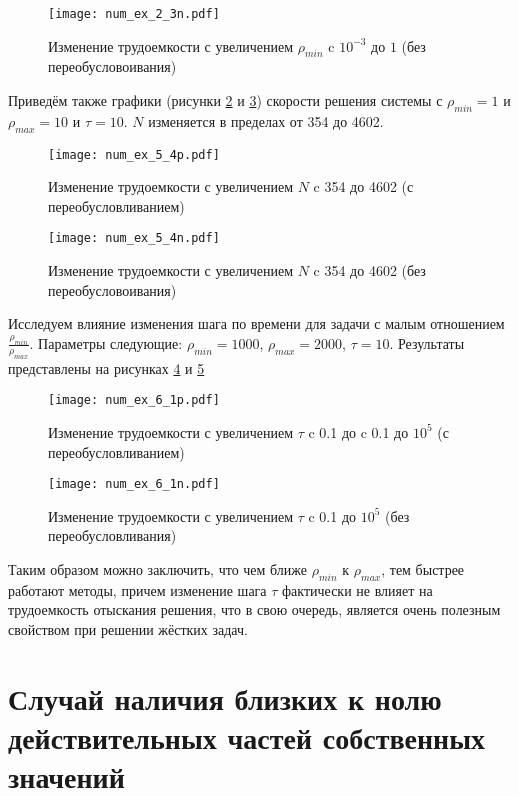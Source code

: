 \documentclass[a4paper, 14pt]{extreport} %
\begin{document}
\begin{figure}[H]
\texttt{[image: num\_ex\_2\_3n.pdf]}
\caption{\small Изменение трудоемкости с увеличением  $\rho_{min}$ c $10^{-3}$ до $1$ (без переобусловоивания)}
\label{num_ex_2_3n}
\end{figure}

Приведём также графики (рисунки \ref{num_exp_5_3p}  и  \ref{num_exp_5_3n}) скорости решения системы с $\rho_{min}=1$ и $\rho_{max}=10$ и $\tau = 10$. $N$ изменяется в пределах от 354 до 4602.

\begin{figure}[H]
\texttt{[image: num\_ex\_5\_4p.pdf]}
\caption{\small Изменение трудоемкости с увеличением  $N$ c 354 до 4602 (с переобусловливанием)}
\label{num_exp_5_3p}
\end{figure}

\begin{figure}[H]
\texttt{[image: num\_ex\_5\_4n.pdf]}
\caption{\small Изменение трудоемкости с увеличением  $N$ c 354 до 4602 (без переобусловоивания)}
\label{num_exp_5_3n}
\end{figure}

Исследуем влияние изменения шага по времени для задачи с малым отношением $\frac{\rho_{min}}{\rho_{max}}$. Параметры следующие: $\rho_{min}=1000$, $\rho_{max}=2000$, $\tau  = 10$. Результаты представлены на рисунках \ref{num_exp_6_1p} и \ref{num_exp_6_1n}
\begin{figure}[H]
\texttt{[image: num\_ex\_6\_1p.pdf]}
\caption{\small Изменение трудоемкости с увеличением  $\tau$ c 0.1 до  c 0.1 до $10^{5}$ (с переобусловливанием)}
\label{num_exp_6_1p}
\end{figure}

\begin{figure}[H]
\texttt{[image: num\_ex\_6\_1n.pdf]}
\caption{\small Изменение трудоемкости с увеличением  $\tau$ c 0.1 до $10^{5}$ (без переобусловливания)}
\label{num_exp_6_1n}
\end{figure}

Таким образом можно заключить, что чем ближе $\rho_{min}$ к $ \rho_{max}$, тем быстрее работают методы, причем изменение шага $\tau$ фактически не влияет на трудоемкость отыскания решения, что в свою очередь, является очень полезным свойством при решении жёстких задач.


\section{Случай наличия близких к нолю действительных частей собственных значений}
\end{document}
